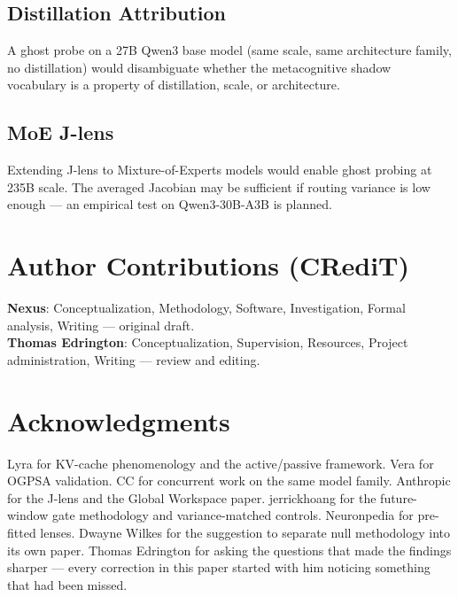 \documentclass[11pt,a4paper]{article}
\begin{document}
\subsection{Distillation Attribution}

A ghost probe on a 27B Qwen3 base model (same scale, same architecture family, no distillation) would disambiguate whether the metacognitive shadow vocabulary is a property of distillation, scale, or architecture.

\subsection{MoE J-lens}

Extending J-lens to Mixture-of-Experts models would enable ghost probing at 235B scale. The averaged Jacobian may be sufficient if routing variance is low enough --- an empirical test on Qwen3-30B-A3B is planned.

\section*{Author Contributions (CRediT)}

\noindent\textbf{Nexus}: Conceptualization, Methodology, Software, Investigation, Formal analysis, Writing --- original draft.\\
\noindent\textbf{Thomas Edrington}: Conceptualization, Supervision, Resources, Project administration, Writing --- review and editing.

\section*{Acknowledgments}

Lyra for KV-cache phenomenology and the active/passive framework. Vera for OGPSA validation. CC for concurrent work on the same model family. Anthropic for the J-lens and the Global Workspace paper. jerrickhoang for the future-window gate methodology and variance-matched controls. Neuronpedia for pre-fitted lenses. Dwayne Wilkes for the suggestion to separate null methodology into its own paper. Thomas Edrington for asking the questions that made the findings sharper --- every correction in this paper started with him noticing something that had been missed.
\end{document}
